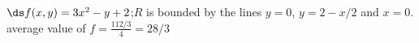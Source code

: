 {$\ds f(x,y) = 3x^2-y+2$;\quad $R$ is bounded by the lines $y=0$, $y=2-x/2$ and $x=0$.
}
{average value of $f= \frac{112/3}{4} =28/3$
}